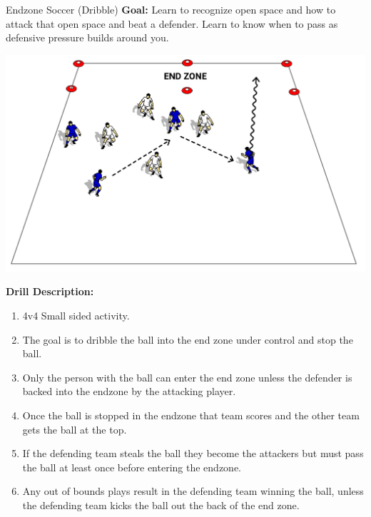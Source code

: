 \begin{evenBlock}{Endzone Soccer (Dribble)}
\textbf{Goal:} Learn to recognize open space and how to attack that open space and beat a defender.  Learn to know when to pass as defensive pressure builds around you.
\begin{minipage}[t]{\linewidth}
    \begin{minipage}{.3\linewidth} %
        \centering
        \includegraphics[width=\textwidth]{../img/Trimmed/EndZoneSoccer_DribbleScore}
    \end{minipage}
    \hspace{0.05\linewidth}
    \begin{minipage}{.6\linewidth} %
        \textbf{Drill Description:}
        \begin{enumerate}
            \setlength{\itemsep}{0pt}
            \setlength{\parskip}{0pt}
            \setlength{\parsep}{0pt}
            \item 4v4 Small sided activity.
            \item The goal is to dribble the ball into the end zone under control and stop the ball.
            \item Only the person with the ball can enter the end zone unless the defender is backed into the endzone by the attacking player.
            \item Once the ball is stopped in the endzone that team scores and the other team gets the ball at the top.
            \item If the defending team steals the ball they become the attackers but must pass the ball at least once before entering the endzone.
            \item Any out of bounds plays result in the defending team winning the ball, unless the defending team kicks the ball out the back of the end zone.

\end{enumerate}
\end{minipage}
\end{minipage}
\end{evenBlock}
